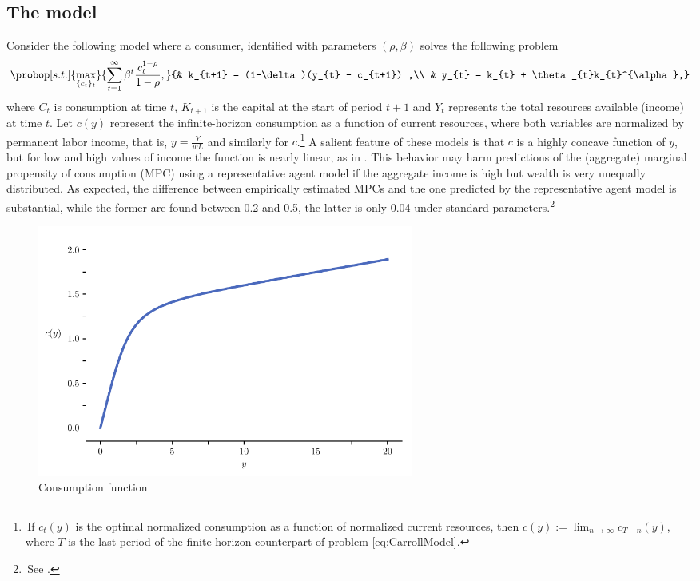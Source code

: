 \documentclass[english, a4paper, 12pt]{article}
\begin{document}
\subsection{The model}
Consider the following model where a consumer, identified with parameters $(\rho, \beta)$ solves the following problem
	\begin{equation} \label{eq:CarrollModel}
		\probop[s.t.]{\max_{\{c_{t}\}_{t}}}{\sum_{t=1}^{\infty} \beta^{t}\frac{c_{t}^{1-\rho}}{1-\rho},}
					{&	k_{t+1} = (1-\delta)(y_{t} - c_{t+1})	,\\
					&	y_{t} = k_{t} + \theta_{t}k_{t}^{\alpha},}
	\end{equation}
where $C_{t}$ is consumption at time $t$, $K_{t+1}$ is the capital at the start of period $t+1$ and $Y_{t}$ represents the total resources available (income) at time $t$. Let $c(y)$ represent the infinite-horizon consumption as a function of current resources, where both variables are normalized by permanent labor income, that is, $y = \frac{Y}{wL}$ and similarly for $c$.\footnote{\,If $c_{t}(y)$ is the optimal normalized consumption as a function of normalized current resources, then $c(y) := \lim_{n \to \infty} c_{T-n}(y)$, where $T$ is the last period of the finite horizon counterpart of problem \eqref{eq:CarrollModel}.} A salient feature of these models is that $c$ is a highly concave function of $y$, but for low and high values of income the function is nearly linear, as in . This behavior may harm predictions of the (aggregate) marginal propensity of consumption (MPC) using a representative agent model if the aggregate income is high but wealth is very unequally distributed. As expected, the difference between empirically estimated MPCs and the one predicted by the representative agent model is substantial, while the former are found between 0.2 and 0.5, the latter is only 0.04 under standard parameters.\footnote{\,See \cite{CarrollRequiem}.}
\vfill
	\begin{figure}[H]
		\caption{Consumption function}
		\label{fig:concaveC}
		\includegraphics[width=0.6\textwidth]{CarrollCons}
		\vspace{-1ex}
	\end{figure}
\end{document}
